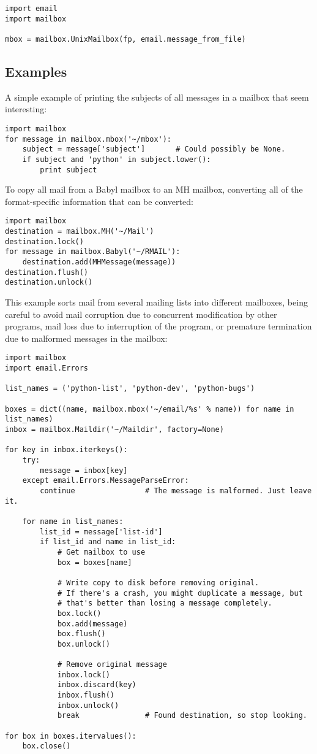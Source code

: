 \begin{verbatim}
import email
import mailbox

mbox = mailbox.UnixMailbox(fp, email.message_from_file)
\end{verbatim}

\subsection{Examples}
\label{mailbox-examples}

A simple example of printing the subjects of all messages in a mailbox that
seem interesting:

\begin{verbatim}
import mailbox
for message in mailbox.mbox('~/mbox'):
    subject = message['subject']       # Could possibly be None.
    if subject and 'python' in subject.lower():
        print subject
\end{verbatim}

To copy all mail from a Babyl mailbox to an MH mailbox, converting all
of the format-specific information that can be converted:

\begin{verbatim}
import mailbox
destination = mailbox.MH('~/Mail')
destination.lock()
for message in mailbox.Babyl('~/RMAIL'):
    destination.add(MHMessage(message))
destination.flush()
destination.unlock()
\end{verbatim}

This example sorts mail from several mailing lists into different
mailboxes, being careful to avoid mail corruption due to concurrent
modification by other programs, mail loss due to interruption of the
program, or premature termination due to malformed messages in the
mailbox:

\begin{verbatim}
import mailbox
import email.Errors

list_names = ('python-list', 'python-dev', 'python-bugs')

boxes = dict((name, mailbox.mbox('~/email/%s' % name)) for name in list_names)
inbox = mailbox.Maildir('~/Maildir', factory=None)

for key in inbox.iterkeys():
    try:
        message = inbox[key]
    except email.Errors.MessageParseError:
        continue                # The message is malformed. Just leave it.

    for name in list_names:
        list_id = message['list-id']
        if list_id and name in list_id:
            # Get mailbox to use
            box = boxes[name]

            # Write copy to disk before removing original.
            # If there's a crash, you might duplicate a message, but
            # that's better than losing a message completely.
            box.lock()
            box.add(message)
            box.flush()         
            box.unlock()

            # Remove original message
            inbox.lock()
            inbox.discard(key)
            inbox.flush()
            inbox.unlock()
            break               # Found destination, so stop looking.

for box in boxes.itervalues():
    box.close()
\end{verbatim}
